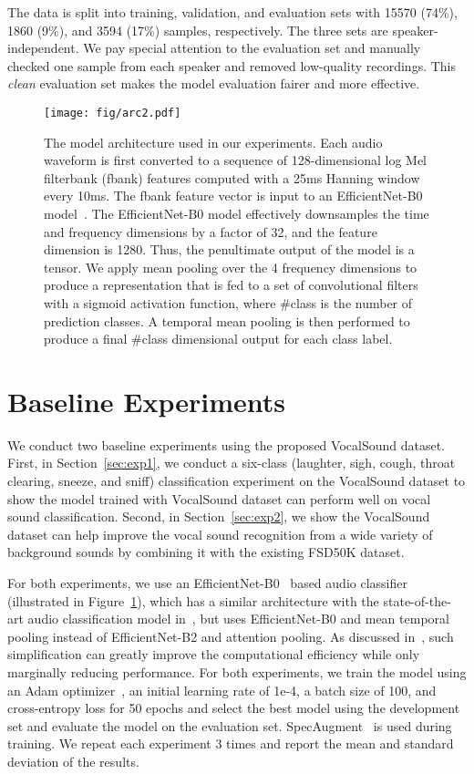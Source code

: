 \documentclass{article}
\newcommand{\squeezeup}{\vspace{-1.6mm}}
\begin{document}
The data is split into training, validation, and evaluation sets with 15570 (74\%), 1860 (9\%), and 3594 (17\%) samples, respectively. The three sets are speaker-independent. We pay special attention to the evaluation set and manually checked one sample from each speaker and removed low-quality recordings. This \emph{clean} evaluation set makes the model evaluation fairer and more effective.



\begin{figure}[t]
  \centering
  \texttt{[image: fig/arc2.pdf]}
  \caption{The model architecture used in our experiments. Each audio waveform is first converted to a sequence of 128-dimensional log Mel filterbank (fbank) features computed with a 25ms Hanning window every 10ms. The  fbank feature vector is input to an EfficientNet-B0 model~\cite{tan2019efficientnet}. The EfficientNet-B0 model effectively downsamples the time and frequency dimensions by a factor of 32, and the feature dimension is 1280. Thus, the penultimate output of the model is a  tensor. We apply mean pooling over the 4 frequency dimensions to produce a  representation that is fed to a set of  convolutional filters with a sigmoid activation function, where \#class is the number of prediction classes. A temporal mean pooling is then performed to produce a final \#class dimensional output for each class label.}
  \label{fig:arc}
  \squeezeup\squeezeup
\end{figure}

\squeezeup\squeezeup
\section{Baseline Experiments}
\squeezeup
\label{sec:exp}

We conduct two baseline experiments using the proposed VocalSound dataset. First, in Section~\ref{sec:exp1}, we conduct a six-class (laughter, sigh, cough, throat clearing, sneeze, and sniff) classification experiment on the VocalSound dataset to show the model trained with VocalSound dataset can perform well on vocal sound classification. Second, in Section~\ref{sec:exp2}, we show the VocalSound dataset can help improve the vocal sound recognition from a wide variety of background sounds by combining it with the existing FSD50K dataset.

For both experiments, we use an EfficientNet-B0~\cite{tan2019efficientnet} based audio classifier (illustrated in Figure~\ref{fig:arc}), which has a similar architecture with the state-of-the-art audio classification model in~\cite{gong2021psla}, but uses EfficientNet-B0 and mean temporal pooling instead of EfficientNet-B2 and attention pooling. As discussed in~\cite{gong2021psla}, such simplification can greatly improve the computational efficiency while only marginally reducing performance. For both experiments, we train the model using an Adam optimizer~\cite{kingma2014adam}, an initial learning rate of 1e-4, a batch size of 100, and cross-entropy loss for 50 epochs and select the best model using the development set and evaluate the model on the evaluation set. SpecAugment~\cite{park19e_interspeech} is used during training. We repeat each experiment 3 times and report the mean and standard deviation of the results.
\end{document}
